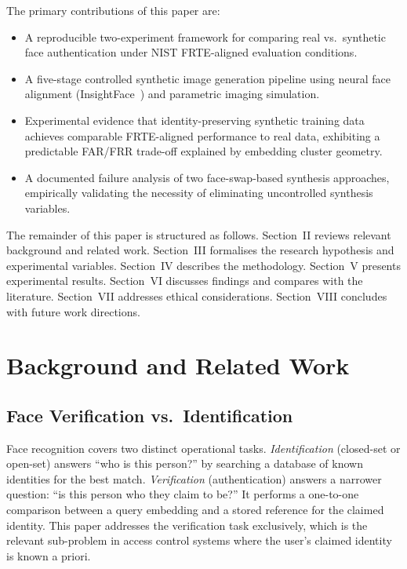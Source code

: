 \documentclass[conference]{IEEEtran}
\begin{document}
The primary contributions of this paper are:
\begin{itemize}
    \item A reproducible two-experiment framework for comparing real vs.\ synthetic face authentication under NIST FRTE-aligned evaluation conditions.
    \item A five-stage controlled synthetic image generation pipeline using neural face alignment (InsightFace~\cite{deng2019insightface}) and parametric imaging simulation.
    \item Experimental evidence that identity-preserving synthetic training data achieves comparable FRTE-aligned performance to real data, exhibiting a predictable FAR/FRR trade-off explained by embedding cluster geometry.
    \item A documented failure analysis of two face-swap-based synthesis approaches, empirically validating the necessity of eliminating uncontrolled synthesis variables.
\end{itemize}

The remainder of this paper is structured as follows. Section~II reviews relevant background and related work. Section~III formalises the research hypothesis and experimental variables. Section~IV describes the methodology. Section~V presents experimental results. Section~VI discusses findings and compares with the literature. Section~VII addresses ethical considerations. Section~VIII concludes with future work directions.

\section{Background and Related Work}

\subsection{Face Verification vs.\ Identification}

Face recognition covers two distinct operational tasks. \textit{Identification} (closed-set or open-set) answers ``who is this person?'' by searching a database of known identities for the best match. \textit{Verification} (authentication) answers a narrower question: ``is this person who they claim to be?'' It performs a one-to-one comparison between a query embedding and a stored reference for the claimed identity. This paper addresses the verification task exclusively, which is the relevant sub-problem in access control systems where the user's claimed identity is known a priori.
\end{document}
